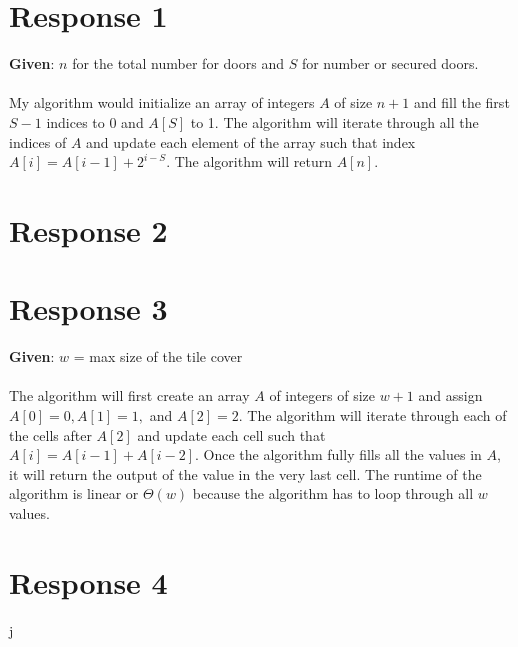 \documentclass[12pt, a4paper]{article}
\begin{document}
\maketitle
\section*{\centering Response 1}
\textbf{Given}: \(n\) for the total number for doors and \(S\) for number or secured doors.
\\
\\
My algorithm would initialize an array of integers \(A\) of size \(n + 1\) and fill the first \(S-1\) indices to 0 and \(A[S]\) to 1. 
The algorithm will iterate through all the indices of \(A\) and update each element of the array such that index \(A[i] = A[i - 1] + 2^{i - S}\).
The algorithm will return \(A[n]\).

\newpage
\section*{\centering Response 2}

\newpage
\section*{\centering Response 3}

\textbf{Given}: \(w\) = max size of the tile cover
\\
\\
The algorithm will first create an array \(A\) of integers of size \(w + 1\) and assign \(A[0] = 0, A[1] = 1,\) and \(A[2] = 2\).
The algorithm will iterate through each of the cells after \(A[2]\) and update each cell such that \(A[i] = A[i - 1] + A[i - 2]\).
Once the algorithm fully fills all the values in \(A\), it will return the output of the value in the very last cell.
The runtime of the algorithm is linear or \(\Theta(w)\) because the algorithm has to loop through all \(w\) values.   

\newpage
\section*{\centering Response 4}
j
\end{document}
